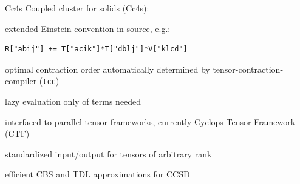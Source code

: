 \begin{poster}

\begin{posterbox}[name=cc4s,column=2,below=einleitung,span=1]{Cc4s}
Coupled cluster for solids (Cc4s):
\begin{compactitem}
\item extended Einstein convention in source, e.g.:
{\small
\begin{lstlisting}
R["abij"] += T["acik"]*T["dblj"]*V["klcd"]
\end{lstlisting}
}
\item
optimal contraction order automatically determined
by tensor-contraction-compiler (\texttt{tcc})
\item
lazy evaluation only of terms needed
\item
interfaced to parallel tensor frameworks,
	currently Cyclops Tensor Framework (CTF)~\cite{solomonik2014} %
\item 
standardized input/output for tensors of arbitrary rank
\item efficient CBS and TDL approximations for CCSD~\cite{gruber2018,irmler2021}
\end{compactitem}
\end{posterbox}



\end{poster}

